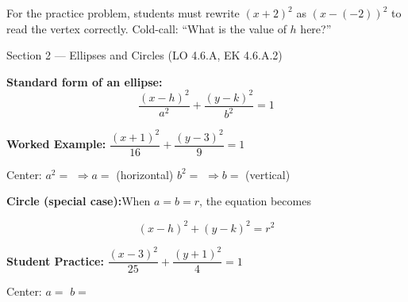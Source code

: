 \documentclass[10pt]{article}
\begin{document}
\begin{teachernote}
For the practice problem, students must rewrite $(x+2)^2$ as $(x-(-2))^2$ to read
the vertex correctly. Cold-call: ``What is the value of $h$ here?''
\end{teachernote}

\vspace{0.08in}

\begin{notesbox}{Section 2 --- Ellipses and Circles (LO 4.6.A, EK 4.6.A.2)}

\textbf{Standard form of an ellipse:}
\[
  \frac{(x-h)^2}{a^2} + \frac{(y-k)^2}{b^2} = 1
\]

\textbf{Worked Example:}\quad
$\dfrac{(x+1)^2}{16} + \dfrac{(y-3)^2}{9} = 1$

\vspace{6pt}
Center:  \quad
$a^2 =$  $\Rightarrow a =$  (horizontal) \quad
$b^2 =$  $\Rightarrow b =$  (vertical)

\vspace{10pt}
\textbf{Circle (special case):}\quad When $a = b = r$, the equation becomes

\[
  (x - h)^2 + (y - k)^2 = r^2
\]

\textbf{Student Practice:}\quad
$\dfrac{(x-3)^2}{25} + \dfrac{(y+1)^2}{4} = 1$

Center:  \quad $a =$  \quad $b =$ 

\end{notesbox}

\vspace{0.08in}
\end{document}
